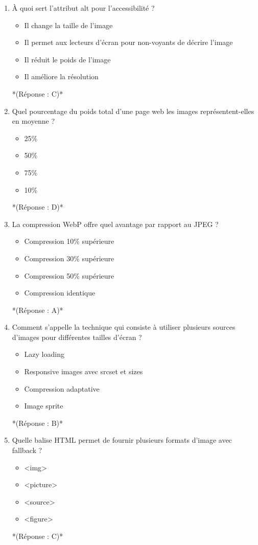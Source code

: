 \documentclass[12pt,a4paper,twoside]{report}
\begin{document}
\begin{enumerate}
\item À quoi sert l'attribut alt pour l'accessibilité ?
\begin{itemize}
\item[A)] Il change la taille de l'image
\item[B)] Il permet aux lecteurs d'écran pour non-voyants de décrire l'image
\item[C)] Il réduit le poids de l'image
\item[D)] Il améliore la résolution
\end{itemize}
*(Réponse : C)*

\item Quel pourcentage du poids total d'une page web les images représentent-elles en moyenne ?
\begin{itemize}
\item[A)] 25\%
\item[B)] 50\%
\item[C)] 75\%
\item[D)] 10\%
\end{itemize}
*(Réponse : D)*

\item La compression WebP offre quel avantage par rapport au JPEG ?
\begin{itemize}
\item[A)] Compression 10\% supérieure
\item[B)] Compression 30\% supérieure
\item[C)] Compression 50\% supérieure
\item[D)] Compression identique
\end{itemize}
*(Réponse : A)*

\item Comment s'appelle la technique qui consiste à utiliser plusieurs sources d'images pour différentes tailles d'écran ?
\begin{itemize}
\item[A)] Lazy loading
\item[B)] Responsive images avec srcset et sizes
\item[C)] Compression adaptative
\item[D)] Image sprite
\end{itemize}
*(Réponse : B)*

\item Quelle balise HTML permet de fournir plusieurs formats d'image avec fallback ?
\begin{itemize}
\item[A)] <img>
\item[B)] <picture>
\item[C)] <source>
\item[D)] <figure>
\end{itemize}
*(Réponse : C)*


\end{enumerate}
\end{document}
